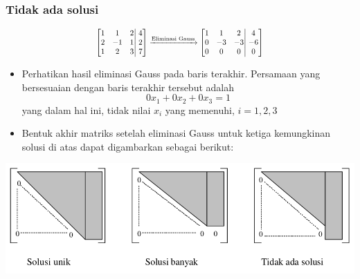 \documentclass[pdflatex,compress,mathserif]{beamer}
\newcommand*{\Scale}[2][4]{\scalebox{#1}{$#2$}}%
\begin{document}
\begin{frame}
	\frametitle{Tidak ada solusi}
	\[
	\Scale[0.8]{
		\left[
		\begin{matrix}
		1 & 1 & 2\\
		2 & -1 & 1\\
		1 & 2 & 3\\
		\end{matrix}
		\right|
		\left.
		\begin{matrix}
		4 \\ 2 \\ 7
		\end{matrix}
		\right]
		\xrightarrow{\text{Eliminasi Gauss}}
		\left[
		\begin{matrix}
		1 & 1 & 2\\
		0 & -3 & -3\\
		0 & 0 & 0\\
		\end{matrix}
		\right|
		\left.
		\begin{matrix}
		4 \\ -6 \\ 0
		\end{matrix}
		\right]
	}\]
	\begin{itemize}
		\item Perhatikan hasil eliminasi Gauss pada baris terakhir. Persamaan yang bersesuaian dengan baris terakhir tersebut adalah
		\[ 0x_1 + 0x_2 + 0x_3 = 1 \]
		yang dalam hal ini, tidak nilai $ x_i $ yang memenuhi, $ i = 1, 2, 3 $
	\end{itemize}
\end{frame}

\begin{frame}
	\begin{itemize}
		\item Bentuk akhir matriks setelah eliminasi Gauss untuk ketiga kemungkinan solusi di atas dapat digambarkan sebagai berikut:
	\end{itemize}
	\begin{center}
		\includegraphics[width=0.9\linewidth]{img/img02}
	\end{center}
\end{frame}
\end{document}
